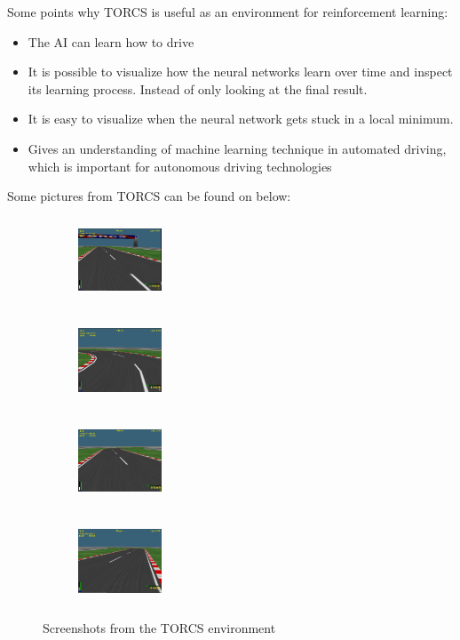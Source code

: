 Some points why TORCS is useful as an environment for reinforcement learning:
\begin{itemize}
	\item The AI can learn how to drive
	\item It is possible to visualize how the neural networks learn over time and inspect its learning process. Instead of only looking at the final result.
	\item It is easy to visualize when the neural network gets stuck in a local minimum.
	\item Gives an understanding of machine learning technique in automated driving, which is important for autonomous driving technologies 
\end{itemize}
Some pictures from TORCS can be found on  below:
\begin{figure} [H]
	\centering
	\begin{subfigure}{.20\textwidth}
		\centering
		\includegraphics[width=25mm, height=25mm]{Figures/Architecture/Torcs/torcs_2.png}
	\end{subfigure}
	\begin{subfigure}{.20\textwidth}
	\centering
	\includegraphics[width=25mm, height=25mm]{Figures/Architecture/Torcs/torcs_3.png}
    \end{subfigure}
	\begin{subfigure}{.20\textwidth}
	\centering
	\includegraphics[width=25mm, height=25mm]{Figures/Architecture/Torcs/torcs_4.png}
	\end{subfigure}
	\begin{subfigure}{.20\textwidth}
	\centering
	\includegraphics[width=25mm, height=25mm]{Figures/Architecture/Torcs/torcs_5.png}
	\end{subfigure}
	\caption{Screenshots from the TORCS environment}
	\label{fig:torcs_screenshots}
\end{figure}
\newpage      
